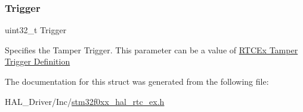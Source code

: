 \subsubsection{\texorpdfstring{Trigger}{Trigger}}
{\footnotesize\ttfamily uint32\+\_\+t Trigger}

Specifies the Tamper Trigger. This parameter can be a value of \hyperlink{group___r_t_c_ex___tamper___trigger___definitions}{R\+T\+C\+Ex Tamper Trigger Definition} 

The documentation for this struct was generated from the following file\+:\begin{DoxyCompactItemize}
\item 
H\+A\+L\+\_\+\+Driver/\+Inc/\hyperlink{stm32f0xx__hal__rtc__ex_8h}{stm32f0xx\+\_\+hal\+\_\+rtc\+\_\+ex.\+h}\end{DoxyCompactItemize}
